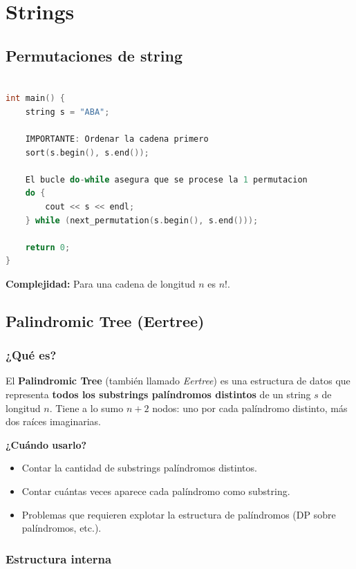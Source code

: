 \chapter{Strings}


\section{Permutaciones de string}
\begin{lstlisting}[language=C++, caption=Next\_permutation]

int main() {
    string s = "ABA";
    
    IMPORTANTE: Ordenar la cadena primero
    sort(s.begin(), s.end()); 
    
    El bucle do-while asegura que se procese la 1 permutacion
    do {
        cout << s << endl;
    } while (next_permutation(s.begin(), s.end()));
    
    return 0;
}
\end{lstlisting}
\textbf{Complejidad:} Para una cadena de longitud $n$ es $n!$.

\section{Palindromic Tree (Eertree)}

\subsection{¿Qué es?}

El \textbf{Palindromic Tree} (también llamado \textit{Eertree}) es una estructura de datos que representa \textbf{todos los substrings palíndromos distintos} de un string $s$ de longitud $n$. Tiene a lo sumo $n+2$ nodos: uno por cada palíndromo distinto, más dos raíces imaginarias.

\bigskip

\textbf{¿Cuándo usarlo?}
\begin{itemize}
    \item Contar la cantidad de substrings palíndromos distintos.
    \item Contar cuántas veces aparece cada palíndromo como substring.
    \item Problemas que requieren explotar la estructura de palíndromos (DP sobre palíndromos, etc.).
\end{itemize}

\subsection{Estructura interna}

